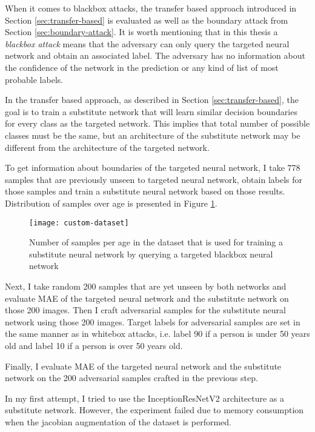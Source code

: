 When it comes to blackbox attacks, the transfer based approach introduced in Section \ref{sec:transfer-based} is evaluated as well as the boundary attack from Section \ref{sec:boundary-attack}. It is worth mentioning that in this thesis a \textit{blackbox attack} means that the adversary can only query the targeted neural network and obtain an associated label. The adversary has no information about the confidence of the network in the prediction or any kind of list of most probable labels.

In the transfer based approach, as described in Section \ref{sec:transfer-based}, the goal is to train a substitute network that will learn similar decision boundaries for every class as the targeted network. This implies that total number of possible classes must be the same, but an architecture of the substitute network may be different from the architecture of the targeted network.

To get information about boundaries of the targeted neural network,  I take 778 samples that are previously unseen to targeted neural network, obtain labels for those samples and train a substitute neural network based on those results. Distribution of samples over age is presented in Figure \ref{fig:custom-dataset}.
 
 \begin{figure}[h]
\texttt{[image: custom-dataset]}
\caption{Number of samples per age in the dataset that is used for training a substitute neural network by querying a targeted blackbox neural network}
\label{fig:custom-dataset}
\end{figure}

Next, I take random 200 samples that are yet unseen by both networks and evaluate MAE of the targeted neural network and the substitute network on those 200 images. Then I craft adversarial samples for the substitute neural network using those 200 images. Target labels for adversarial samples are set in the same manner as in whitebox attacks, i.e. label 90 if a person is under 50 years old and label 10 if a person is over 50 years old. 

Finally, I evaluate MAE of the targeted neural network and the substitute network on the 200 adversarial samples crafted in the previous step.

In my first attempt, I tried to use the InceptionResNetV2 architecture as a substitute network. However, the experiment failed due to memory consumption when the jacobian augmentation of the dataset is performed. 

